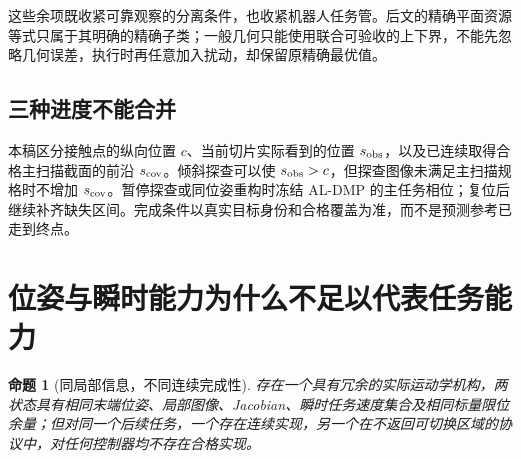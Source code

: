 \documentclass[11pt,a4paper]{article}
\theoremstyle{cn}
\newtheorem{proposition}[theorem]{命题}
\begin{document}
这些余项既收紧可靠观察的分离条件，也收紧机器人任务管。后文的精确平面资源等式只属于其明确的精确子类；一般几何只能使用联合可验收的上下界，不能先忽略几何误差，执行时再任意加入扰动，却保留原精确最优值。

\subsection{三种进度不能合并}

本稿区分接触点的纵向位置 \(c\)、当前切片实际看到的位置 \(s_{\rm obs}\)，以及已连续取得合格主扫描截面的前沿 \(s_{\rm cov}\)。倾斜探查可以使 \(s_{\rm obs}>c\)，但探查图像未满足主扫描规格时不增加 \(s_{\rm cov}\)。暂停探查或同位姿重构时冻结 AL-DMP 的主任务相位；复位后继续补齐缺失区间。完成条件以真实目标身份和合格覆盖为准，而不是预测参考已走到终点。

\section{位姿与瞬时能力为什么不足以代表任务能力}
\label{sec:counter}

\begin{proposition}[同局部信息，不同连续完成性]
\label{prop:counter}
存在一个具有冗余的实际运动学机构，两状态具有相同末端位姿、局部图像、Jacobian、瞬时任务速度集合及相同标量限位余量；但对同一个后续任务，一个存在连续实现，另一个在不返回可切换区域的协议中，对任何控制器均不存在合格实现。
\end{proposition}
\end{document}
